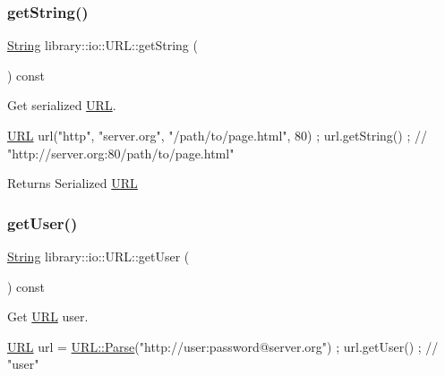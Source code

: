 \subsubsection{\texorpdfstring{get\+String()}{getString()}}
{\footnotesize\ttfamily \hyperlink{namespacelibrary_1_1io_a7469b45835a4421045db344d6a5a1f85}{String} library\+::io\+::\+U\+R\+L\+::get\+String (\begin{DoxyParamCaption}{ }\end{DoxyParamCaption}) const}



Get serialized \hyperlink{classlibrary_1_1io_1_1_u_r_l}{U\+RL}. 


\begin{DoxyCode}
\hyperlink{classlibrary_1_1io_1_1_u_r_l_a7e9c070138a6dbd000ffb10b7cd8a5c4}{URL} url(\textcolor{stringliteral}{"http"}, \textcolor{stringliteral}{"server.org"}, \textcolor{stringliteral}{"/path/to/page.html"}, 80) ;
url.getString() ; \textcolor{comment}{// "http://server.org:80/path/to/page.html"}
\end{DoxyCode}


\begin{DoxyReturn}{Returns}
Serialized \hyperlink{classlibrary_1_1io_1_1_u_r_l}{U\+RL} 
\end{DoxyReturn}
\mbox{\label{classlibrary_1_1io_1_1_u_r_l_a1671af07f30ce9ce7a316437c5a731f7}} 
\subsubsection{\texorpdfstring{get\+User()}{getUser()}}
{\footnotesize\ttfamily \hyperlink{namespacelibrary_1_1io_a7469b45835a4421045db344d6a5a1f85}{String} library\+::io\+::\+U\+R\+L\+::get\+User (\begin{DoxyParamCaption}{ }\end{DoxyParamCaption}) const}



Get \hyperlink{classlibrary_1_1io_1_1_u_r_l}{U\+RL} user. 


\begin{DoxyCode}
\hyperlink{classlibrary_1_1io_1_1_u_r_l_a7e9c070138a6dbd000ffb10b7cd8a5c4}{URL} url = \hyperlink{classlibrary_1_1io_1_1_u_r_l_a98cf42141cf75e1dd5362eb208a1e2bd}{URL::Parse}(\textcolor{stringliteral}{"http://user:password@server.org"}) ;
url.getUser() ; \textcolor{comment}{// "user"}
\end{DoxyCode}


